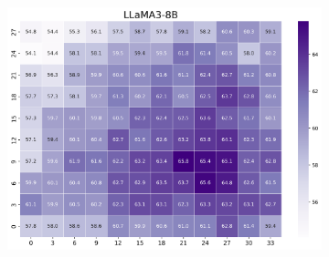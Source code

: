 \documentclass[11pt]{article}
\begin{document}
\begin{figure}[h]
\begin{subfigure}[b]{0.3\linewidth}
        \centering
        \includegraphics[width=\linewidth]{picture/figure3_LLaMA3-8B.png}
    \end{subfigure}
    

\end{figure}
\end{document}
